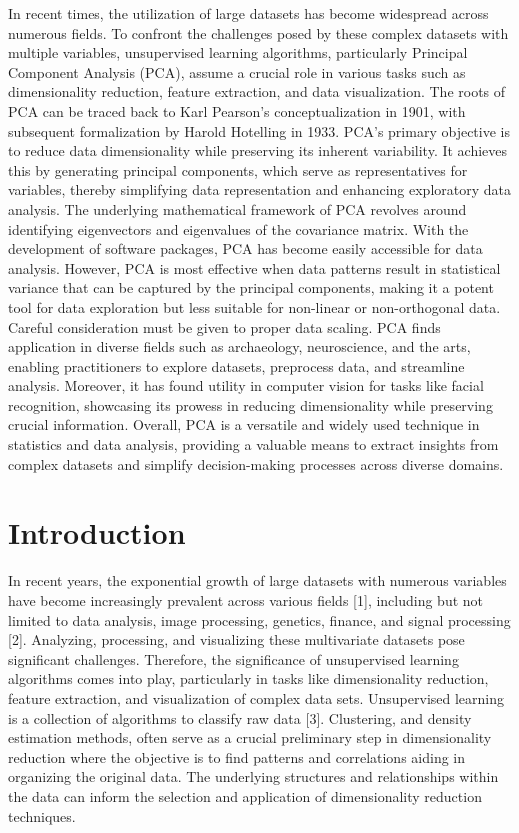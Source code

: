 \documentclass[
  letterpaper,
  DIV=11,
  numbers=noendperiod]{scrreprt}
\begin{document}
In recent times, the utilization of large datasets has become widespread
across numerous fields. To confront the challenges posed by these
complex datasets with multiple variables, unsupervised learning
algorithms, particularly Principal Component Analysis (PCA), assume a
crucial role in various tasks such as dimensionality reduction, feature
extraction, and data visualization. The roots of PCA can be traced back
to Karl Pearson's conceptualization in 1901, with subsequent
formalization by Harold Hotelling in 1933. PCA's primary objective is to
reduce data dimensionality while preserving its inherent variability. It
achieves this by generating principal components, which serve as
representatives for variables, thereby simplifying data representation
and enhancing exploratory data analysis. The underlying mathematical
framework of PCA revolves around identifying eigenvectors and
eigenvalues of the covariance matrix. With the development of software
packages, PCA has become easily accessible for data analysis. However,
PCA is most effective when data patterns result in statistical variance
that can be captured by the principal components, making it a potent
tool for data exploration but less suitable for non-linear or
non-orthogonal data. Careful consideration must be given to proper data
scaling. PCA finds application in diverse fields such as archaeology,
neuroscience, and the arts, enabling practitioners to explore datasets,
preprocess data, and streamline analysis. Moreover, it has found utility
in computer vision for tasks like facial recognition, showcasing its
prowess in reducing dimensionality while preserving crucial information.
Overall, PCA is a versatile and widely used technique in statistics and
data analysis, providing a valuable means to extract insights from
complex datasets and simplify decision-making processes across diverse
domains.


\hypertarget{intro}{%
\chapter{Introduction}\label{intro}}

In recent years, the exponential growth of large datasets with numerous
variables have become increasingly prevalent across various fields
{[}1{]}, including but not limited to data analysis, image processing,
genetics, finance, and signal processing {[}2{]}. Analyzing, processing,
and visualizing these multivariate datasets pose significant challenges.
Therefore, the significance of unsupervised learning algorithms comes
into play, particularly in tasks like dimensionality reduction, feature
extraction, and visualization of complex data sets. Unsupervised
learning is a collection of algorithms to classify raw data {[}3{]}.
Clustering, and density estimation methods, often serve as a crucial
preliminary step in dimensionality reduction where the objective is to
find patterns and correlations aiding in organizing the original data.
The underlying structures and relationships within the data can inform
the selection and application of dimensionality reduction techniques.
\end{document}
